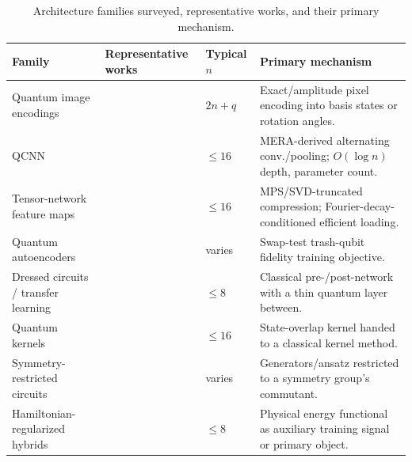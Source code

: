 \documentclass[11pt]{article}
\begin{document}
\begin{table}[h]
\centering
\caption{Architecture families surveyed, representative works, and their primary mechanism.}
\label{tab:summary}
\scriptsize
\begin{tabular}{p{}p{}p{}p{}}
\toprule
Family & Representative works & Typical $n$ & Primary mechanism \\
\midrule
Quantum image encodings & \cite{Le2011,Zhang2013} & $2n{+}q$ & Exact/amplitude pixel encoding into basis states or rotation angles. \\
QCNN & \cite{Cong2019,Pesah2021,Hur2022} & $\le 16$ & MERA-derived alternating conv./pooling; $O(\log n)$ depth, parameter count. \\
Tensor-network feature maps & \cite{Stoudenmire2016,Han2018,Guala2023,Jobst2024} & $\le 16$ & MPS/SVD-truncated compression; Fourier-decay-conditioned efficient loading. \\
Quantum autoencoders & \cite{Romero2017,QCAE2023} & varies & Swap-test trash-qubit fidelity training objective. \\
Dressed circuits / transfer learning & \cite{Mari2020} & $\le 8$ & Classical pre-/post-network with a thin quantum layer between. \\
Quantum kernels & \cite{Havlicek2019,QuantumKernelDefect2022} & $\le 16$ & State-overlap kernel handed to a classical kernel method. \\
Symmetry-restricted circuits & \cite{Meyer2023,Nguyen2024EQNN,West2024,West2023} & varies & Generators/ansatz restricted to a symmetry group's commutant. \\
Hamiltonian-regularized hybrids & \cite{Shi2022,Park2024} & $\le 8$ & Physical energy functional as auxiliary training signal or primary object. \\
\bottomrule
\end{tabular}
\end{table}
\end{document}

